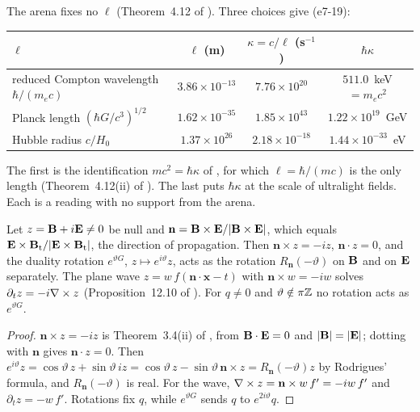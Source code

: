 The arena fixes no $\ell$ (Theorem~4.12 of \cite{RE}). Three choices give (e7-19):
\begin{center}
\small
\begin{tabular}{@{}lccc@{}}
\toprule
$\ell$ & $\ell$ (m) & $\kappa=c/\ell$ (s$^{-1}$) & $\hbar\kappa$\\
\midrule
reduced Compton wavelength $\hbar/(m_ec)$ & $3.86\times10^{-13}$ & $7.76\times10^{20}$ & $511.0$~keV $=m_ec^2$\\
Planck length $(\hbar G/c^3)^{1/2}$ & $1.62\times10^{-35}$ & $1.85\times10^{43}$ & $1.22\times10^{19}$~GeV\\
Hubble radius $c/H_0$ \cite{Planck18VI} & $1.37\times10^{26}$ & $2.18\times10^{-18}$ & $1.44\times10^{-33}$~eV\\
\bottomrule
\end{tabular}
\end{center}
The first is the identification $mc^2=\hbar\kappa$ of \cite{RE}, for which $\ell=\hbar/(mc)$ is the only length (Theorem~4.12(ii) of \cite{RE}). The
last puts $\hbar\kappa$ at the scale of ultralight fields. Each is a reading with no support from the arena.

\begin{proposition}
\label{e7:prop:dualrot}
Let $z=\mathbf B+i\mathbf E\neq0$ be null and $\mathbf n=\mathbf B\times\mathbf E/|\mathbf B\times\mathbf E|$, which equals $\mathbf E\times\mathbf B_{\rm t}/|\mathbf E\times\mathbf B_{\rm t}|$, the direction of
propagation. Then $\mathbf n\times z=-iz$, $\mathbf n\cdot z=0$, and the duality rotation $e^{\vartheta G}$, $z\mapsto e^{i\vartheta}z$, acts as the
rotation $R_{\mathbf n}(-\vartheta)$ on $\mathbf B$ and on $\mathbf E$ separately. The plane wave $z=w\,f(\mathbf n\cdot\mathbf x-t)$ with $\mathbf n\times w=-iw$
solves $\partial_tz=-i\nabla\times z$ (Proposition~12.10 of \cite{ES17}). For $q\neq0$ and $\vartheta\notin\pi\mathbb{Z}$ no rotation acts as $e^{\vartheta G}$.
\end{proposition}

\begin{proof}
$\mathbf n\times z=-iz$ is Theorem~3.4(ii) of \cite{RE}, from $\mathbf B\cdot\mathbf E=0$ and $|\mathbf B|=|\mathbf E|$; dotting with $\mathbf n$ gives $\mathbf n\cdot z=0$. Then
$e^{i\vartheta}z=\cos\vartheta\,z+\sin\vartheta\,iz=\cos\vartheta\,z-\sin\vartheta\,\mathbf n\times z=R_{\mathbf n}(-\vartheta)z$ by Rodrigues' formula,
and $R_{\mathbf n}(-\vartheta)$ is real. For the wave, $\nabla\times z=\mathbf n\times w\,f'=-iw\,f'$ and $\partial_tz=-w\,f'$. Rotations fix $q$, while
$e^{\vartheta G}$ sends $q$ to $e^{2i\vartheta}q$.
\end{proof}

